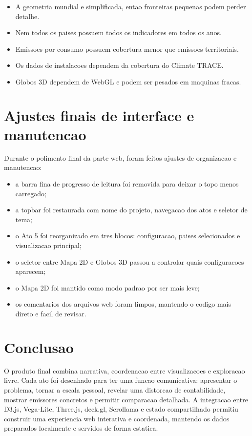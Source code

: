 \documentclass[12pt,a4paper]{article}
\begin{document}
\begin{itemize}
  \item A geometria mundial e simplificada, entao fronteiras pequenas podem perder detalhe.
  \item Nem todos os paises possuem todos os indicadores em todos os anos.
  \item Emissoes por consumo possuem cobertura menor que emissoes territoriais.
  \item Os dados de instalacoes dependem da cobertura do Climate TRACE.
  \item Globos 3D dependem de WebGL e podem ser pesados em maquinas fracas.
\end{itemize}

\section{Ajustes finais de interface e manutencao}

Durante o polimento final da parte web, foram feitos ajustes de organizacao e manutencao:

\begin{itemize}
  \item a barra fina de progresso de leitura foi removida para deixar o topo menos carregado;
  \item a topbar foi restaurada com nome do projeto, navegacao dos atos e seletor de tema;
  \item o Ato 5 foi reorganizado em tres blocos: configuracao, paises selecionados e visualizacao principal;
  \item o seletor entre Mapa 2D e Globos 3D passou a controlar quais configuracoes aparecem;
  \item o Mapa 2D foi mantido como modo padrao por ser mais leve;
  \item os comentarios dos arquivos web foram limpos, mantendo o codigo mais direto e facil de revisar.
\end{itemize}

\section{Conclusao}

O produto final combina narrativa, coordenacao entre visualizacoes e exploracao livre. Cada ato foi desenhado para ter uma funcao comunicativa: apresentar o problema, tornar a escala pessoal, revelar uma distorcao de contabilidade, mostrar emissores concretos e permitir comparacao detalhada. A integracao entre D3.js, Vega-Lite, Three.js, deck.gl, Scrollama e estado compartilhado permitiu construir uma experiencia web interativa e coordenada, mantendo os dados preparados localmente e servidos de forma estatica.
\end{document}
